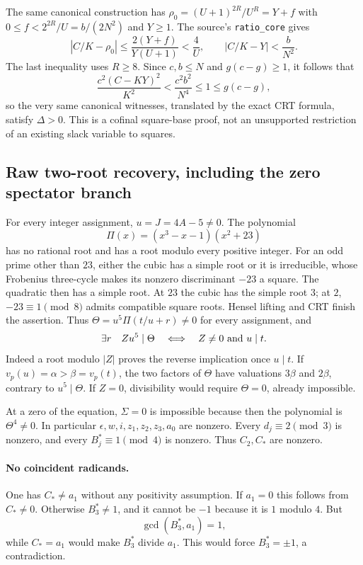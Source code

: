 The same canonical construction has
$\rho_0=(U+1)^{2R}/U^R=Y+f$ with
$0\le f<2^{2R}/U=b/(2N^2)$ and $Y\ge1$.
The source's \texttt{ratio\_core} gives
\[
 |C/K-\rho_0|\le\frac{2(Y+f)}{Y(U+1)}<\frac4U,
 \qquad |C/K-Y|<\frac b{N^2}.
\]
The last inequality uses $R\ge8$. Since $c,b\le N$ and
$g(c-g)\ge1$, it follows that
\[
 \frac{c^2(C-KY)^2}{K^2}<\frac{c^2b^2}{N^4}\le1\le g(c-g),
\]
so the very same canonical witnesses, translated by the exact CRT formula, satisfy $\Delta>0$.
This is a cofinal square-base proof, not an unsupported restriction of an
existing slack variable to squares.

\subsection{Raw two-root recovery, including the zero spectator branch}
For every integer assignment, $u=J=4A-5\ne0$. The polynomial
\[
 \Pi(x)=(x^3-x-1)(x^2+23)
\]
has no rational root and has a root modulo every positive integer.
For an odd prime other than $23$, either the cubic has a simple root or it
is irreducible, whose Frobenius three-cycle makes its nonzero discriminant
$-23$ a square. The quadratic then has a simple root. At $23$ the cubic has
the simple root $3$; at $2$, $-23\equiv1\pmod8$ admits compatible square
roots. Hensel lifting and CRT finish the assertion. Thus
$\Theta=u^5\Pi(t/u+r)\ne0$ for every assignment, and
\[
 \exists r\quad Zu^5\mid\Theta
 \quad\Longleftrightarrow\quad Z\ne0\ \hbox{and}\ u\mid t.
\]
Indeed a root modulo $|Z|$ proves the reverse implication once $u\mid t$.
If $v_p(u)=\alpha>\beta=v_p(t)$, the two factors of $\Theta$ have
valuations $3\beta$ and $2\beta$, contrary to $u^5\mid\Theta$.
If $Z=0$, divisibility would require $\Theta=0$, already impossible.

At a zero of the equation, $\Sigma=0$ is impossible because then the
polynomial is $\Theta^4\ne0$. In particular
$\epsilon,w,i,z_1,z_2,z_3,a_0$ are nonzero. Every $d_j\equiv2\pmod3$
is nonzero, and every $B_j^*\equiv1\pmod4$ is nonzero. Thus $C_2,C_*$
are nonzero.

\paragraph{No coincident radicands.}
One has $C_*\ne a_1$ without any positivity assumption. If $a_1=0$ this
follows from $C_*\ne0$. Otherwise $B_3^*\ne1$, and it cannot be $-1$
because it is $1$ modulo $4$. But
\[
 \gcd(B_3^*,a_1)=1,
\]
while $C_*=a_1$ would make $B_3^*$ divide $a_1$. This would force
$B_3^*=\pm1$, a contradiction.

